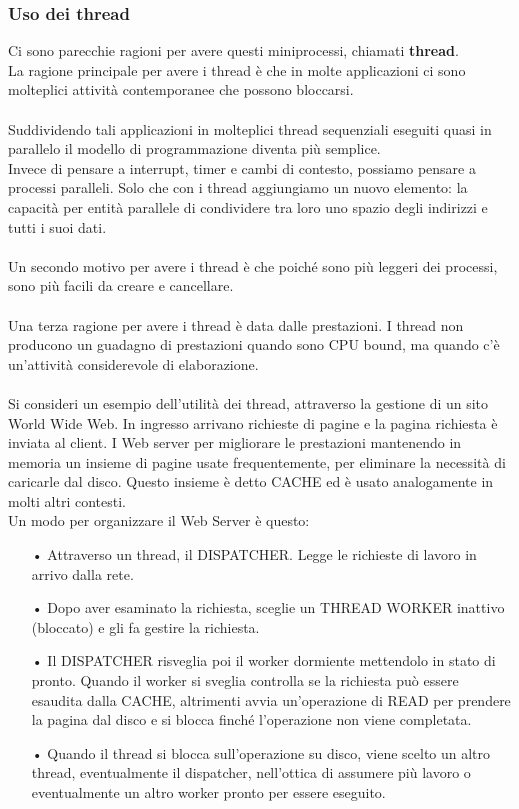 \documentclass{article}
\begin{document}
\subsubsection{Uso dei thread}
Ci sono parecchie ragioni per avere questi miniprocessi, chiamati \textbf{thread}.
\\
La ragione principale per avere i thread è che in molte applicazioni ci sono molteplici attività contemporanee che possono bloccarsi.
\\
\\
Suddividendo tali applicazioni in molteplici thread sequenziali eseguiti quasi in parallelo il modello di programmazione diventa più semplice.
\\Invece di pensare a interrupt, timer e cambi di contesto, possiamo pensare a processi paralleli. Solo che con i thread aggiungiamo un nuovo elemento: la capacità per entità parallele di condividere tra loro uno spazio degli indirizzi e tutti i suoi dati.
\\
\\Un secondo motivo per avere i thread è che poiché sono più leggeri dei processi, sono più facili da creare e cancellare.
\\
\\Una terza ragione per avere i thread è data dalle prestazioni. I thread non producono un guadagno di prestazioni quando sono CPU bound, ma quando c’è un’attività considerevole di elaborazione.
\\
\\
Si consideri un esempio dell’utilità dei thread, attraverso la gestione di un sito World Wide Web. In ingresso arrivano richieste di pagine e la pagina richiesta è inviata al client. I Web server per migliorare le prestazioni mantenendo in memoria un insieme di pagine usate frequentemente, per eliminare la necessità di caricarle dal disco. Questo insieme è detto CACHE ed è usato analogamente in molti altri contesti.
\\
Un modo per organizzare il Web Server è questo:
\begin{enumerate}
   \item[•] Attraverso un thread, il DISPATCHER. Legge le richieste di lavoro in arrivo dalla rete.
   \item[•] Dopo aver esaminato la richiesta, sceglie un THREAD WORKER inattivo (bloccato) e gli fa gestire la richiesta.
   \item[•] Il DISPATCHER risveglia poi il worker dormiente mettendolo in stato di pronto. Quando il worker si sveglia controlla se la richiesta può essere esaudita dalla CACHE, altrimenti avvia un’operazione di READ per prendere la pagina dal disco e si blocca finché l’operazione non viene completata. 
   \item[•] Quando il thread si blocca sull’operazione su disco, viene scelto un altro thread, eventualmente il dispatcher, nell’ottica di assumere più lavoro o eventualmente un altro worker pronto per essere eseguito.
\end{enumerate}
\end{document}
